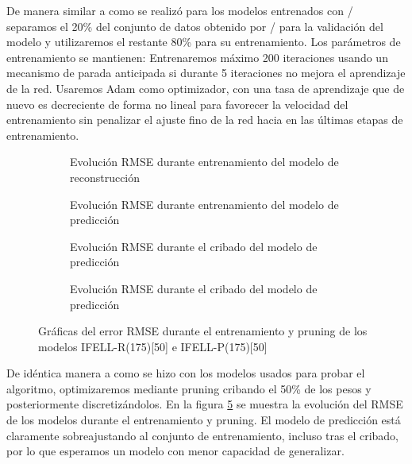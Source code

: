 De manera similar a como se realizó para los modelos entrenados con \sisfall/ separamos el 20\% del conjunto de datos obtenido por \accelcapture/ para la validación del modelo y utilizaremos el restante 80\% para su entrenamiento. Los parámetros de entrenamiento se mantienen: Entrenaremos máximo 200 iteraciones usando un mecanismo de parada anticipada si durante 5 iteraciones no mejora el aprendizaje de la red. Usaremos Adam como optimizador, con una tasa de aprendizaje que de nuevo es decreciente de forma no lineal para favorecer la velocidad del entrenamiento sin penalizar el ajuste fino de la red hacia en las últimas etapas de entrenamiento. 

\begin{figure}[htb!]
  \centering
  \begin{subfigure}[b]{0.47\textwidth}
      \centering
      \caption{\footnotesize \label{fig:ifell:adata:recon:train} Evolución RMSE durante entrenamiento del modelo de reconstrucción}
  \end{subfigure}
  \centering
  \hfill
  \begin{subfigure}[b]{0.47\textwidth}
      \centering
      \caption{\footnotesize \label{fig:ifell:adata:pred:train} Evolución RMSE durante entrenamiento del modelo de predicción}
  \end{subfigure}

  \begin{subfigure}[b]{0.47\textwidth}
      \centering
      \caption{\footnotesize \label{fig:ifell:adata:recon:prune} Evolución RMSE durante el cribado del modelo de predicción}
  \end{subfigure}
  \begin{subfigure}[b]{0.47\textwidth}
      \centering
      \caption{\footnotesize \label{fig:ifell:adata:pred:prune} Evolución RMSE durante el cribado del modelo de predicción}
  \end{subfigure}
  \caption{\label{fig:ifell:adata:training} Gráficas del error RMSE durante el entrenamiento y pruning de los modelos IFELL-R(175)[50] e IFELL-P(175)[50]}
\end{figure}
De idéntica manera a como se hizo con los modelos usados para probar el algoritmo, optimizaremos mediante pruning cribando el 50\% de los pesos y posteriormente discretizándolos. En la figura \ref{fig:ifell:adata:training} se muestra la evolución del RMSE de los modelos durante el entrenamiento y pruning. El modelo de predicción está claramente sobreajustando al conjunto de entrenamiento, incluso tras el cribado, por lo que esperamos un modelo con menor capacidad de generalizar.

